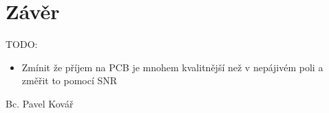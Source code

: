 \section{Závěr}
\label{sec:Conclusion}

TODO:
\begin{itemize}
\item Zmínit že příjem na PCB je mnohem kvalitnější než v nepájivém poli a změřit to pomocí SNR
\end{itemize}

\bigskip
\begin{flushright}
Bc. Pavel Kovář
\end{flushright}